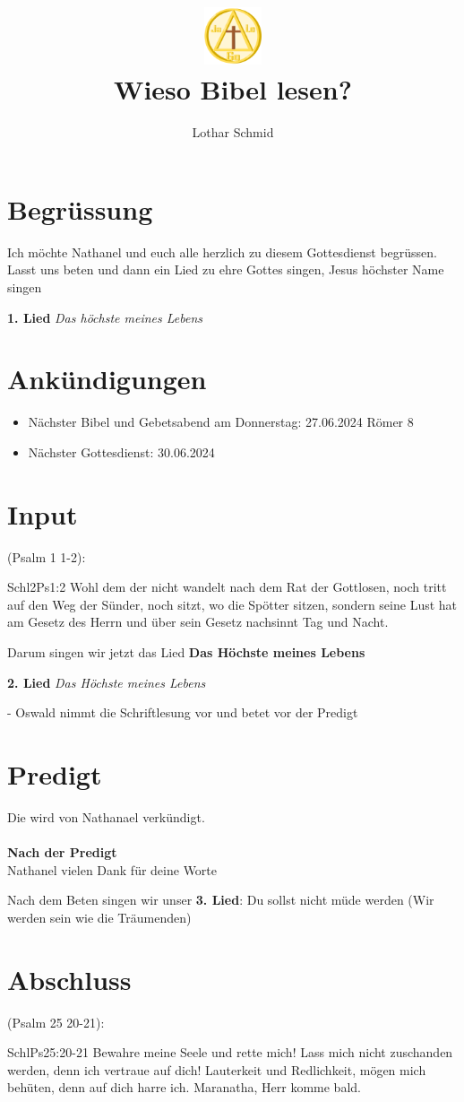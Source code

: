 \documentclass[12pt,a4paper]{scrarticle}
\title{\includegraphics[height=48pt]{assets/images/logo.png}\\Wieso Bibel lesen?}
\author{Lothar Schmid}
\begin{document}
\maketitle

\section{Begrüssung}
Ich möchte Nathanel und euch alle herzlich zu diesem Gottesdienst begrüssen.
\\
Lasst uns beten und dann ein Lied zu ehre Gottes singen, Jesus höchster Name singen

\textbf{1. Lied}
\textit{Das höchste meines Lebens}

\section{Ankündigungen}
\begin{itemize}
    \item Nächster Bibel und Gebetsabend am Donnerstag: 
27.06.2024 Römer 8 
    \item Nächster Gottesdienst: 30.06.2024 
\end{itemize}

\section{ Input }

(Psalm 1 1-2):
\begin{bibeltext}{Schl2}{Ps}{1:2}
Wohl dem der nicht wandelt nach dem Rat der Gottlosen, noch tritt auf den Weg der Sünder, noch sitzt, wo die Spötter sitzen, sondern seine Lust hat am Gesetz des Herrn und über sein Gesetz nachsinnt Tag und Nacht.
\end{bibeltext}

Darum singen wir jetzt das Lied \textbf{Das Höchste meines Lebens}

\textbf{2. Lied} \textit{Das Höchste meines Lebens}

- Oswald nimmt die Schriftlesung vor und betet vor der Predigt

\section{Predigt}
Die wird von Nathanael verkündigt.
\\
\\
\textbf{Nach der Predigt}\\
Nathanel vielen Dank für deine Worte 

Nach dem Beten singen wir unser \textbf{3. Lied}: Du sollst nicht müde werden (Wir werden sein wie die Träumenden)

\section{Abschluss}
(Psalm 25 20-21):
\begin{bibeltext}{Schl}{Ps}{25:20-21}
Bewahre meine Seele und rette mich! Lass mich nicht zuschanden werden, denn ich vertraue auf dich! Lauterkeit und Redlichkeit, mögen mich behüten, denn auf dich harre ich.
Maranatha, Herr komme bald.
\end{bibeltext}
\end{document}
